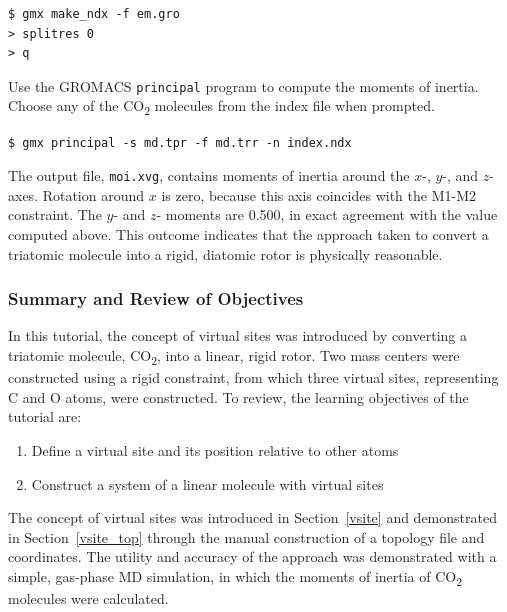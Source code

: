 \documentclass[9pt,tutorial,pubversion]{livecoms}
\begin{document}
\begin{lstlisting}
$ gmx make_ndx -f em.gro
> splitres 0
> q
\end{lstlisting}

Use the GROMACS \texttt{principal} program to compute the moments of inertia. Choose any of the CO\textsubscript{2} molecules from the index file when prompted.

\begin{lstlisting}
$ gmx principal -s md.tpr -f md.trr -n index.ndx
\end{lstlisting}

The output file, \texttt{moi.xvg}, contains moments of inertia around the $x$-, $y$-, and $z$-axes. Rotation around $x$ is zero, because this axis coincides with the M1-M2 constraint. The $y$- and $z$- moments are 0.500, in exact agreement with the value computed above. This outcome indicates that the approach taken to convert a triatomic molecule into a rigid, diatomic rotor is physically reasonable.

\subsubsection{Summary and Review of Objectives} \label{vsite_summary}

In this tutorial, the concept of virtual sites was introduced by converting a triatomic molecule, CO\textsubscript{2}, into a linear, rigid rotor. Two mass centers were constructed using a rigid constraint, from which three virtual sites, representing C and O atoms, were constructed. To review, the learning objectives of the tutorial are:

\begin{enumerate}
	\item Define a virtual site and its position relative to other atoms
	\item Construct a system of a linear molecule with virtual sites
\end{enumerate}

The concept of virtual sites was introduced in Section~\ref{vsite} and demonstrated in Section~\ref{vsite_top} through the manual construction of a topology file and coordinates. The utility and accuracy of the approach was demonstrated with a simple, gas-phase MD simulation, in which the moments of inertia of CO\textsubscript{2} molecules were calculated.

\end{document}
